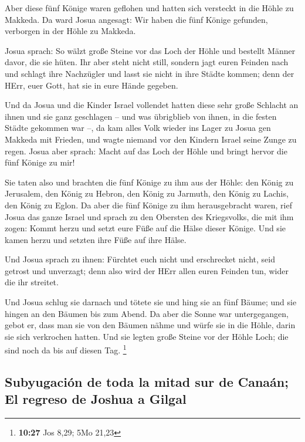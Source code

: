  Aber diese fünf Könige waren geflohen und hatten sich
versteckt in die Höhle zu Makkeda.  Da ward Josua
angesagt: Wir haben die fünf Könige gefunden, verborgen in der Höhle zu
Makkeda.

 Josua sprach: So wälzt große Steine vor das Loch der
Höhle und bestellt Männer davor, die sie hüten.  Ihr aber
steht nicht still, sondern jagt euren Feinden nach und schlagt ihre
Nachzügler und lasst sie nicht in ihre Städte kommen; denn der HErr,
euer Gott, hat sie in eure Hände gegeben.

 Und da Josua und die Kinder Israel vollendet hatten
diese sehr große Schlacht an ihnen und sie ganz geschlagen -- und was
übrigblieb von ihnen, in die festen Städte gekommen war --,
 da kam alles Volk wieder ins Lager zu Josua gen Makkeda
mit Frieden, und wagte niemand vor den Kindern Israel seine Zunge zu
regen.  Josua aber sprach: Macht auf das Loch der Höhle
und bringt hervor die fünf Könige zu mir!

 Sie taten also und brachten die fünf Könige zu ihm aus
der Höhle: den König zu Jerusalem, den König zu Hebron, den König zu
Jarmuth, den König zu Lachis, den König zu Eglon.  Da
aber die fünf Könige zu ihm herausgebracht waren, rief Josua das ganze
Israel und sprach zu den Obersten des Kriegsvolks, die mit ihm zogen:
Kommt herzu und setzt eure Füße auf die Hälse dieser Könige. Und sie
kamen herzu und setzten ihre Füße auf ihre Hälse.

 Und Josua sprach zu ihnen: Fürchtet euch nicht und
erschrecket nicht, seid getrost und unverzagt; denn also wird der HErr
allen euren Feinden tun, wider die ihr streitet.

 Und Josua schlug sie darnach und tötete sie und hing sie
an fünf Bäume; und sie hingen an den Bäumen bis zum Abend.
 Da aber die Sonne war untergegangen, gebot er, dass man
sie von den Bäumen nähme und würfe sie in die Höhle, darin sie sich
verkrochen hatten. Und sie legten große Steine vor der Höhle Loch; die
sind noch da bis auf diesen Tag. \footnote{\textbf{10:27} Jos 8,29; 5Mo
  21,23}

\hypertarget{subyugaciuxf3n-de-toda-la-mitad-sur-de-canauxe1n-el-regreso-de-joshua-a-gilgal}{%
\subsection{Subyugación de toda la mitad sur de Canaán; El regreso de
Joshua a
Gilgal}\label{subyugaciuxf3n-de-toda-la-mitad-sur-de-canauxe1n-el-regreso-de-joshua-a-gilgal}}


